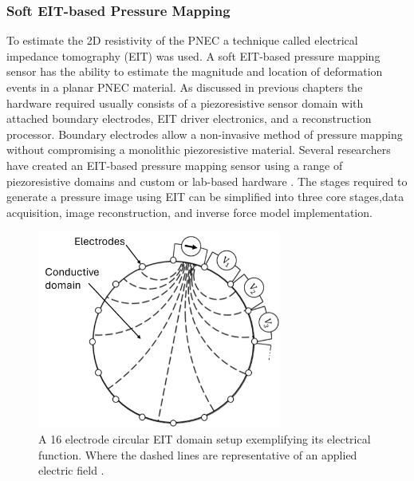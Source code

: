 \subsubsection{Soft EIT-based Pressure Mapping}
\label{subsubsec:eit-based_pressure_mapping}
To estimate the 2D resistivity of the PNEC a technique called electrical impedance tomography (EIT) was used. A soft EIT-based pressure mapping sensor has the ability to estimate the magnitude and location of deformation events in a planar PNEC material. As discussed in previous chapters the hardware required usually consists of a piezoresistive sensor domain with attached boundary electrodes, EIT driver electronics, and a reconstruction processor. Boundary electrodes allow a non-invasive method of pressure mapping without compromising a monolithic piezoresistive material. Several researchers have created an EIT-based pressure mapping sensor using a range of piezoresistive domains and custom or lab-based hardware \cite{Russo2017, Nagakubo2007, Silvera-Tawil2015, Yoon2017, Sun2020, Ellingham2024}. The stages required to generate a pressure image using EIT can be simplified into three core stages,data acquisition, image reconstruction, and inverse force model implementation.
\begin{figure}[H]
	\centering
	\includegraphics[width=8cm]{Figures/EIT_diagram_labelled.jpg}
	\vspace{0.3cm}
	\caption{A 16 electrode circular EIT domain setup exemplifying its electrical function. Where the dashed lines are representative of an applied electric field \cite{Ellingham2022}.}
	\label{fig:EIT_diagram}
\end{figure}
